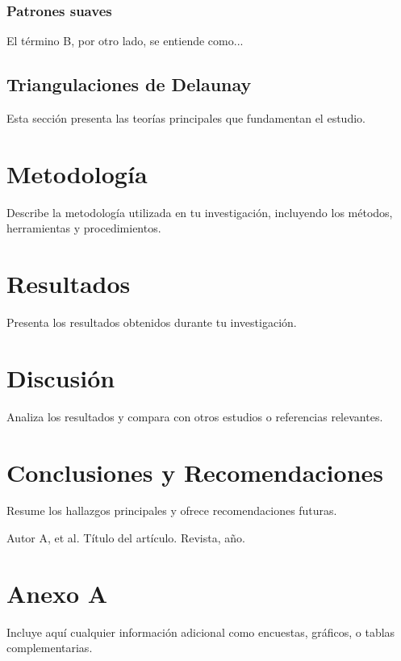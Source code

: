 \documentclass[12pt]{report}
\begin{document}
\subsection{Patrones suaves}
El término B, por otro lado, se entiende como...

\section{Triangulaciones de Delaunay}
Esta sección presenta las teorías principales que fundamentan el estudio.
\chapter{Metodología}
Describe la metodología utilizada en tu investigación, incluyendo los métodos, herramientas y procedimientos.

\chapter{Resultados}
Presenta los resultados obtenidos durante tu investigación.

\chapter{Discusión}
Analiza los resultados y compara con otros estudios o referencias relevantes.

\chapter{Conclusiones y Recomendaciones}
Resume los hallazgos principales y ofrece recomendaciones futuras.


\begin{thebibliography}{9}
	 Autor A, et al. Título del artículo. Revista, año.
\end{thebibliography}


\appendix
\chapter{Anexo A}
Incluye aquí cualquier información adicional como encuestas, gráficos, o tablas complementarias.
\end{document}
